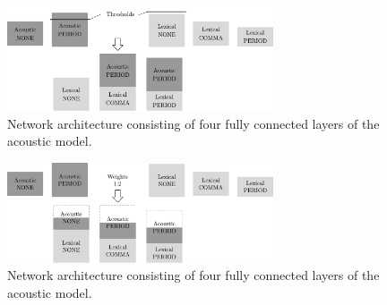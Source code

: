 \begin{figure}[ht]
    \centering
    \includegraphics[width=0.7\textwidth]{img/fusion_1.pdf}
    \caption{Network architecture consisting of four fully connected layers of the acoustic model.}
    \label{fig:fusion_1}
\end{figure}

\begin{figure}[ht]
    \centering
    \includegraphics[width=0.7\textwidth]{img/fusion_2.pdf}
    \caption{Network architecture consisting of four fully connected layers of the acoustic model.}
    \label{fig:fusion_1}
\end{figure}